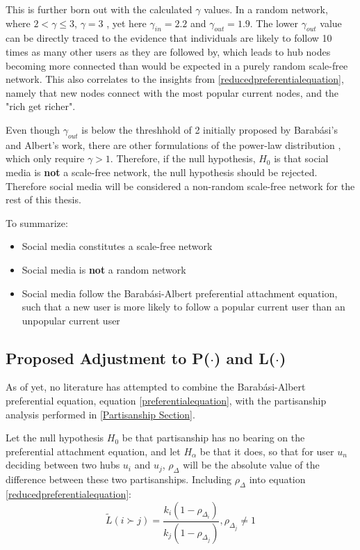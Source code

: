 \documentclass[preprint,review,12pt]{elsarticle}
\begin{document}
This is further born out with the calculated $\gamma$ values. In a random network, where $2 < \gamma \leq 3$, $\gamma = 3$ \cite{barabasi2000scale,pastor2001epidemic}, yet here $\gamma_{in} = 2.2$ and $\gamma_{out} = 1.9$. The lower $\gamma_{out}$ value can be directly traced to the evidence that individuals are likely to follow 10 times as many other users as they are followed by, which leads to hub nodes becoming more connected than would be expected in a purely random scale-free network. This also correlates to the insights from \ref{reducedpreferentialequation}, namely that new nodes connect with the most popular current nodes, and the "rich get richer".

Even though $\gamma_{out}$ is below the threshhold of 2 initially proposed by Barab{\'a}si's and Albert's work, there are other formulations of the power-law distribution \cite{ichinose2017invasion,albert1999diameter,mislove2007measurement,zhang2015exactly,pastor2002epidemic}, which only require $\gamma > 1$. Therefore, if the null hypothesis, $H_0$ is that social media is \textbf{not} a scale-free network, the null hypothesis should be rejected. Therefore social media will be considered a non-random scale-free network for the rest of this thesis.

To summarize:
\begin{itemize}
    \item Social media constitutes a scale-free network
    \item Social media is \textbf{not} a random network
    \item Social media follow the Barab{\'a}si-Albert preferential attachment equation, such that a new user is more likely to follow a popular current user than an unpopular current user
\end{itemize}
\subsection{Proposed Adjustment to P($\cdot$) and L($\cdot$)}
As of yet, no literature has attempted to combine the Barab{\'a}si-Albert preferential equation, equation \ref{preferentialequation}, with the partisanship analysis performed in \ref{Partisanship Section}.

Let the null hypothesis $H_0$ be that partisanship has no bearing on the preferential attachment equation, and let $H_\alpha$ be that it does, so that for user $u_n$ deciding between two hubs $u_i$ and $u_j$, $\rho_{\Delta}$ will be the absolute value of the difference between these two partisanships. Including $\rho_\Delta$ into equation
\ref{reducedpreferentialequation}:
\begin{equation}
\label{Ldotpartisan}
        \tilde{L}(i \succ j)=\frac{k_i(1-\rho_{\Delta_i})}{k_j(1-\rho_{\Delta_j})},\rho_{\Delta_j}\neq 1 
\end{equation}
\end{document}

